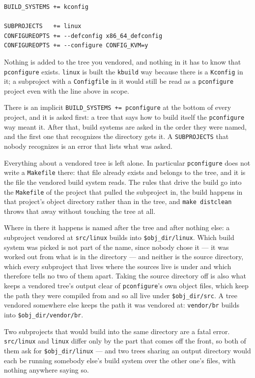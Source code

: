 \documentclass{article}
\newcommand{\pconfigure}{\texttt{pconfigure}}
\begin{document}
\begin{verbatim}
BUILD_SYSTEMS += kconfig

SUBPROJECTS   += linux
CONFIGUREOPTS += --defconfig x86_64_defconfig
CONFIGUREOPTS += --configure CONFIG_KVM=y
\end{verbatim}

Nothing is added to the tree you vendored, and nothing in it has to
know that \texttt{pconfigure} exists.  \texttt{linux} is built the
\texttt{kbuild} way because there is a \texttt{Kconfig} in it; a
subproject with a \texttt{Configfile} in it would still be read as a
\texttt{pconfigure} project even with the line above in scope.

There is an implicit \texttt{BUILD\_SYSTEMS += pconfigure} at the
bottom of every project, and it is asked first: a tree that says how
to build itself the \texttt{pconfigure} way meant it.  After that,
build systems are asked in the order they were named, and the first
one that recognizes the directory gets it.  A \texttt{SUBPROJECTS}
that nobody recognizes is an error that lists what was asked.

Everything about a vendored tree is left alone.  In particular
\texttt{pconfigure} does not write a \texttt{Makefile} there: that
file already exists and belongs to the tree, and it is the file the
vendored build system reads.  The rules that drive the build go into
the \texttt{Makefile} of the project that pulled the subproject in,
the build happens in that project's object directory rather than in
the tree, and \texttt{make distclean} throws that away without
touching the tree at all.

Where in there it happens is named after the tree and after nothing
else: a subproject vendored at \texttt{src/linux} builds into
\texttt{\$obj\_dir/linux}.  Which build system was picked is not part
of the name, since nobody chose it --- it was worked out from what is
in the directory --- and neither is the source directory, which every
subproject that lives where the sources live is under and which
therefore tells no two of them apart.  Taking the source directory
off is also what keeps a vendored tree's output clear of
\pconfigure's own object files, which keep the path they were
compiled from and so all live under \texttt{\$obj\_dir/src}.  A tree
vendored somewhere else keeps the path it was vendored at:
\texttt{vendor/br} builds into \texttt{\$obj\_dir/vendor/br}.

Two subprojects that would build into the same directory are a fatal
error.  \texttt{src/linux} and \texttt{linux} differ only by the part
that comes off the front, so both of them ask for
\texttt{\$obj\_dir/linux} --- and two trees sharing an output
directory would each be running somebody else's build system over the
other one's files, with nothing anywhere saying so.
\end{document}
